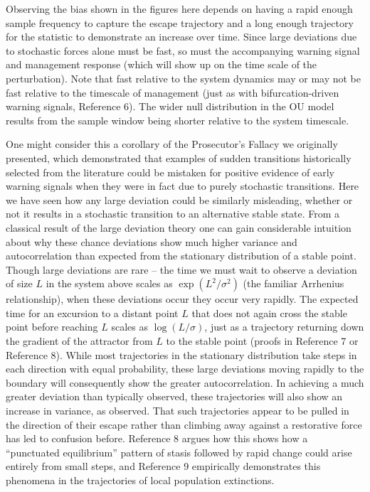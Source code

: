 \documentclass[review]{elsarticle} %
\begin{document}
Observing the bias shown in the figures here depends on having a rapid
enough sample frequency to capture the escape trajectory and a long
enough trajectory for the statistic to demonstrate an increase over
time. Since large deviations due to stochastic forces alone must be
fast, so must the accompanying warning signal and management response
(which will show up on the time scale of the perturbation). Note that
fast relative to the system dynamics may or may not be fast relative to
the timescale of management (just as with bifurcation-driven warning
signals, Reference 6). The wider null distribution in the OU model
results from the sample window being shorter relative to the system
timescale.

One might consider this a corollary of the Prosecutor's Fallacy we
originally presented, which demonstrated that examples of sudden
transitions historically selected from the literature could be mistaken
for positive evidence of early warning signals when they were in fact
due to purely stochastic transitions. Here we have seen how any large
deviation could be similarly misleading, whether or not it results in a
stochastic transition to an alternative stable state. From a classical
result of the large deviation theory one can gain considerable intuition
about why these chance deviations show much higher variance and
autocorrelation than expected from the stationary distribution of a
stable point. Though large deviations are rare -- the time we must wait
to observe a deviation of size $L$ in the system above scales as
$\exp\left(L^2/\sigma^2\right)$ (the familiar Arrhenius relationship),
when these deviations occur they occur very rapidly. The expected time
for an excursion to a distant point $L$ that does not again cross the
stable point before reaching $L$ scales as $\log(L/\sigma)$, just as a
trajectory returning down the gradient of the attractor from $L$ to the
stable point (proofs in Reference 7 or Reference 8). While most
trajectories in the stationary distribution take steps in each direction
with equal probability, these large deviations moving rapidly to the
boundary will consequently show the greater autocorrelation. In
achieving a much greater deviation than typically observed, these
trajectories will also show an increase in variance, as observed. That
such trajectories appear to be pulled in the direction of their escape
rather than climbing away against a restorative force has led to
confusion before. Reference 8 argues how this shows how a ``punctuated
equilibrium'' pattern of stasis followed by rapid change could arise
entirely from small steps, and Reference 9 empirically demonstrates this
phenomena in the trajectories of local population extinctions.
\end{document}
